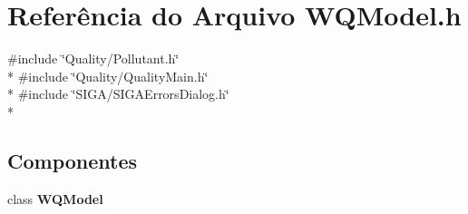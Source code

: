 \section{Referência do Arquivo W\+Q\+Model.\+h}
\label{_w_q_model_8h}
{\ttfamily \#include \char`\"{}Quality/\+Pollutant.\+h\char`\"{}}\\*
{\ttfamily \#include \char`\"{}Quality/\+Quality\+Main.\+h\char`\"{}}\\*
{\ttfamily \#include \char`\"{}S\+I\+G\+A/\+S\+I\+G\+A\+Errors\+Dialog.\+h\char`\"{}}\\*
\subsection*{Componentes}
\begin{DoxyCompactItemize}
\item 
class {\bf W\+Q\+Model}
\end{DoxyCompactItemize}
